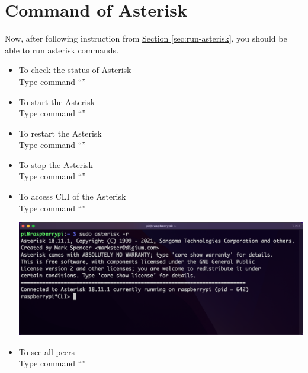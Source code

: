 \section{Command of Asterisk}	\label{sec:command-asterisk}
	Now, after following instruction from \hyperref[sec:run-asterisk]{Section \ref{sec:run-asterisk}}, you should be able to run asterisk commands.
	\begin{itemize}
		\item To check the status of Asterisk\\
		Type command ``{\selectfont{sudo service asterisk status}}''
		\item To start the Asterisk\\
		Type command ``{\selectfont{sudo service asterisk start}}''
		\item To restart the Asterisk\\
		Type command ``{\selectfont{sudo service asterisk restart}}''
		\item To stop the Asterisk\\
		Type command ``{\selectfont{sudo service asterisk stop}}''
		\item To access CLI of the Asterisk\\
		Type command ``{\selectfont{sudo asterisk -r}}''\\
			\begin{minipage}{\textwidth}
				\vspace{2mm}
				\includegraphics[scale=0.35]{Images/raspberry_pi/asterisk_install/CLI.png}
				\vspace{2mm}
			\end{minipage}
		\item To see all peers\\
		Type command ``{\selectfont{sip show peers}}''\\
			\begin{minipage}{\textwidth}
				\vspace{2mm}

\end{minipage}
\end{itemize}
